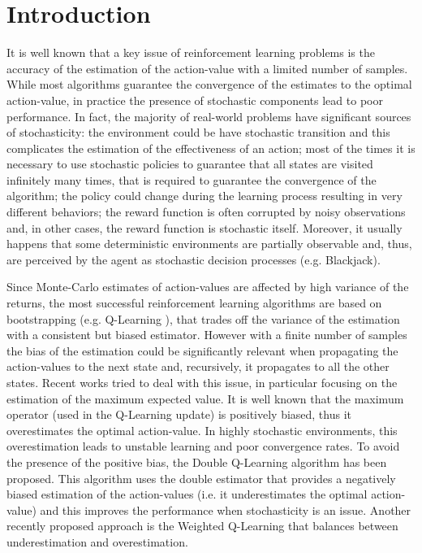 \documentclass[conference]{IEEEtran}
\begin{document}
\section{Introduction}
It is well known that a key issue of reinforcement learning problems is the accuracy of the estimation of the action-value with a limited number of samples. While most algorithms guarantee the convergence of the estimates to the optimal action-value, in practice the presence of stochastic components lead to poor performance. In fact, the majority of real-world problems have significant sources of stochasticity: the environment could be have stochastic transition and this complicates the estimation of the effectiveness of an action; most of the times it is necessary to use stochastic policies to guarantee that all states are visited infinitely many times, that is required to guarantee the convergence of the algorithm; the policy could change during the learning process resulting in very different behaviors; the reward function is often corrupted by noisy observations and, in other cases, the reward function is stochastic itself. Moreover, it usually happens that some deterministic environments are partially observable and, thus, are perceived by the agent as stochastic decision processes (e.g. Blackjack).

Since Monte-Carlo estimates of action-values are affected by high variance of the returns, the most successful reinforcement learning algorithms are based on bootstrapping (e.g. Q-Learning \cite{watkins1992q}), that trades off the variance of the estimation with a consistent but biased estimator. However with a finite number of samples the bias of the estimation could be significantly relevant when propagating the action-values to the next state and, recursively, it propagates to all the other states. Recent works tried to deal with this issue, in particular focusing on the estimation of the maximum expected value. It is well known \cite{smith2006optimizer, van2004rational} that the maximum operator (used in the Q-Learning update) is positively biased, thus it overestimates the optimal action-value. In highly stochastic environments, this overestimation leads to unstable learning and poor convergence rates. To avoid the presence of the positive bias, the Double Q-Learning algorithm \cite{van2010double} has been proposed. This algorithm uses the double estimator \cite{van2013estimating} that provides a negatively biased estimation of the action-values (i.e. it underestimates the optimal action-value) and this improves the performance when stochasticity is an issue. Another recently proposed approach is the Weighted Q-Learning \cite{d2016estimating} that balances between underestimation and overestimation. 
\end{document}
